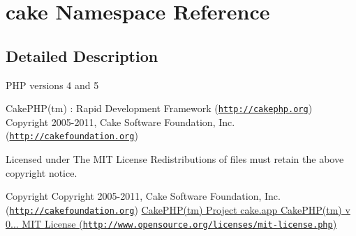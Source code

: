 \hypertarget{namespacecake}{
\section{cake \-Namespace \-Reference}
\label{namespacecake}
}


\subsection{\-Detailed \-Description}
\-P\-H\-P versions 4 and 5

\-Cake\-P\-H\-P(tm) \-: \-Rapid \-Development \-Framework (\href{http://cakephp.org}{\tt http\-://cakephp.\-org}) \-Copyright 2005-\/2011, \-Cake \-Software \-Foundation, \-Inc. (\href{http://cakefoundation.org}{\tt http\-://cakefoundation.\-org})

\-Licensed under \-The \-M\-I\-T \-License \-Redistributions of files must retain the above copyright notice.

\begin{DoxyCopyright}{\-Copyright}
\-Copyright 2005-\/2011, \-Cake \-Software \-Foundation, \-Inc. (\href{http://cakefoundation.org}{\tt http\-://cakefoundation.\-org}) \hyperlink{}{\-Cake\-P\-H\-P(tm) \-Project   cake.\-app  \-Cake\-P\-H\-P(tm) v 0...  \-M\-I\-T \-License (\href{http://www.opensource.org/licenses/mit-license.php}{\tt http\-://www.\-opensource.\-org/licenses/mit-\/license.\-php}) }
\end{DoxyCopyright}
